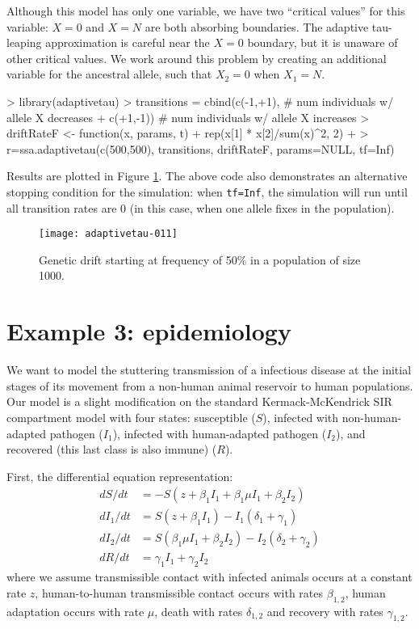 \documentclass[11pt,nogin]{article}
\begin{document}
Although this model has only one variable, we have two ``critical values'' for this variable: $X=0$ and $X=N$ are both absorbing boundaries.  The adaptive tau-leaping approximation is careful near the $X=0$ boundary, but it is unaware of other critical values.  We work around this problem by creating an additional variable for the ancestral allele, such that $X_2 = 0$ when $X_1 = N$.
\begin{Schunk}
\begin{Sinput}
> library(adaptivetau)
> transitions = cbind(c(-1,+1), # num individuals w/ allele X decreases
+                     c(+1,-1)) # num individuals w/ allele X increases
> driftRateF <- function(x, params, t) {
+   rep(x[1] * x[2]/sum(x)^2, 2)
+ }
> r=ssa.adaptivetau(c(500,500), transitions, driftRateF, params=NULL, tf=Inf)
\end{Sinput}
\end{Schunk}
Results are plotted in Figure \ref{fig-drift}.  The above code also demonstrates an alternative stopping condition for the simulation: when \texttt{tf=Inf}, the simulation will run until all transition rates are 0 (in this case, when one allele fixes in the population).
\begin{figure}
  \centerline{
\texttt{[image: adaptivetau-011]}
}\caption{\label{fig-drift} Genetic drift starting at frequency of 50\% in a population of size 1000.}
\end{figure}


\section*{Example 3: epidemiology}
We want to model the stuttering transmission of a infectious disease at the initial stages of its movement from a non-human animal reservoir to human populations.  Our model is a slight modification on the standard Kermack-McKendrick SIR compartment model with four states: susceptible ($S$), infected with non-human-adapted pathogen ($I_1$), infected with human-adapted pathogen ($I_2$), and recovered (this last class is also immune) ($R$).

First, the differential equation representation:
\[
\begin{split}
  dS/dt & = -S(z + \beta_1 I_1 + \beta_1 \mu I_1 + \beta_2 I_2)\\
  dI_{1}/dt & = S(z + \beta_1 I_1) - I_1(\delta_1 + \gamma_1)\\
  dI_{2}/dt & = S(\beta_1 \mu I_1 + \beta_2 I_2) - I_2(\delta_2 + \gamma_2)\\
  dR/dt & = \gamma_1 I_1 + \gamma_2 I_2
\end{split}
\]
where we assume transmissible contact with infected animals occurs at a constant rate $z$, human-to-human transmissible contact occurs with rates $\beta_{1,2}$, human adaptation occurs with rate $\mu$, death with rates $\delta_{1,2}$ and recovery with rates $\gamma_{1,2}$.
\end{document}
